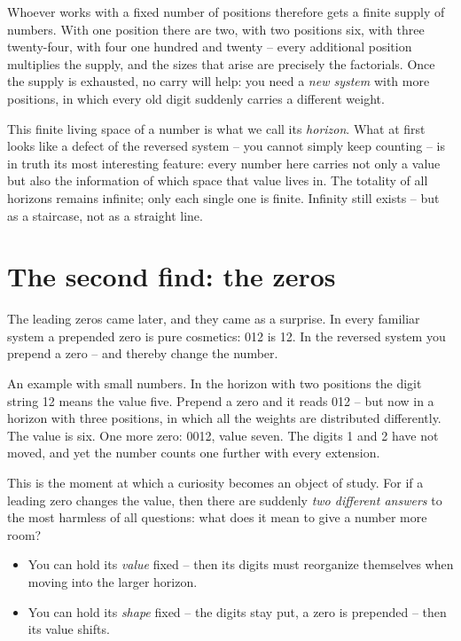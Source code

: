 Whoever works with a fixed number of positions therefore gets a
finite supply of numbers. With one position there are two, with two
positions six, with three twenty-four, with four one hundred and
twenty -- every additional position multiplies the supply, and the
sizes that arise are precisely the factorials. Once the supply is
exhausted, no carry will help: you need a \emph{new system} with
more positions, in which every old digit suddenly carries a
different weight.

This finite living space of a number is what we call its
\emph{horizon}. What at first looks like a defect of the reversed
system -- you cannot simply keep counting -- is in truth its most
interesting feature: every number here carries not only a value but
also the information of which space that value lives in. The
totality of all horizons remains infinite; only each single one is
finite. Infinity still exists -- but as a staircase, not as a
straight line.

\section{The second find: the zeros}

The leading zeros came later, and they came as a surprise. In every
familiar system a prepended zero is pure cosmetics: 012 is 12. In
the reversed system you prepend a zero -- and thereby change the
number.

An example with small numbers. In the horizon with two positions
the digit string 12 means the value five. Prepend a zero and it
reads 012 -- but now in a horizon with three positions, in which
all the weights are distributed differently. The value is six. One
more zero: 0012, value seven. The digits 1 and 2 have not moved,
and yet the number counts one further with every extension.

This is the moment at which a curiosity becomes an object of study.
For if a leading zero changes the value, then there are suddenly
\emph{two different answers} to the most harmless of all questions:
what does it mean to give a number more room?

\begin{itemize}
  \item You can hold its \emph{value} fixed -- then its digits must
        reorganize themselves when moving into the larger horizon.
  \item You can hold its \emph{shape} fixed -- the digits stay
        put, a zero is prepended -- then its value shifts.
\end{itemize}

